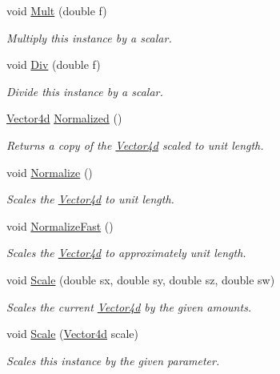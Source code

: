 \begin{DoxyCompactItemize}
void \hyperlink{struct_open_t_k_1_1_vector4d_a0304350bccfedcfb1028b6fb1cfa52da}{Mult} (double f)
\begin{DoxyCompactList}\small\item\em Multiply this instance by a scalar.\end{DoxyCompactList}\item 
void \hyperlink{struct_open_t_k_1_1_vector4d_a72d1b387fa804527aacb055ba9cdb265}{Div} (double f)
\begin{DoxyCompactList}\small\item\em Divide this instance by a scalar.\end{DoxyCompactList}\item 
\hyperlink{struct_open_t_k_1_1_vector4d}{Vector4d} \hyperlink{struct_open_t_k_1_1_vector4d_a08ad67338c6ca937f92f87d5a3e50a67}{Normalized} ()
\begin{DoxyCompactList}\small\item\em Returns a copy of the \hyperlink{struct_open_t_k_1_1_vector4d}{Vector4d} scaled to unit length. \end{DoxyCompactList}\item 
void \hyperlink{struct_open_t_k_1_1_vector4d_ad3ae879d5085a831ae9e995a0be82212}{Normalize} ()
\begin{DoxyCompactList}\small\item\em Scales the \hyperlink{struct_open_t_k_1_1_vector4d}{Vector4d} to unit length. \end{DoxyCompactList}\item 
void \hyperlink{struct_open_t_k_1_1_vector4d_acab4d2793f499d4f5707ea44c18cfdc5}{Normalize\-Fast} ()
\begin{DoxyCompactList}\small\item\em Scales the \hyperlink{struct_open_t_k_1_1_vector4d}{Vector4d} to approximately unit length. \end{DoxyCompactList}\item 
void \hyperlink{struct_open_t_k_1_1_vector4d_a6dba8b157ce434812237ad6b93aab3d9}{Scale} (double sx, double sy, double sz, double sw)
\begin{DoxyCompactList}\small\item\em Scales the current \hyperlink{struct_open_t_k_1_1_vector4d}{Vector4d} by the given amounts. \end{DoxyCompactList}\item 
void \hyperlink{struct_open_t_k_1_1_vector4d_af1bf1d457a3d10650c039f6e982a0876}{Scale} (\hyperlink{struct_open_t_k_1_1_vector4d}{Vector4d} scale)
\begin{DoxyCompactList}\small\item\em Scales this instance by the given parameter.\end{DoxyCompactList}\item 

\end{DoxyCompactItemize}

